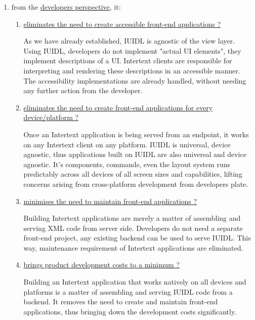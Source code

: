 \begin{enumerate}
\begin{enumerate}
  \end{enumerate}
  \item from the \underline{developers perspective}, it:
  \begin{enumerate}
    \item \underline{ eliminates the need to create accessible front-end applications ?}

    As we have already established, IUIDL is agnostic of the view layer. Using IUIDL, developers do not implement "actual UI elements", they implement descriptions of a UI. Intertext clients are responsible for interpreting and rendering these descriptions in an accessible manner. The accessibility implementations are already handled, without needing any further action from the developer.
    
    \item \underline{eliminates the need to create front-end applications for every} \newline \underline{device/platform ?}

    Once an Intertext application is being served from an endpoint, it works on any Intertext client on any platform. IUIDL is universal, device agnostic, thus applications built on IUIDL are also universal and device agnostic. It's components, commands, even the layout system runs predictably across all devices of all screen sizes and capabilities, lifting concerns arising from cross-platform development from developers plate.
    
    \item \underline{minimises the need to maintain front-end applications ?}

    Building Intertext applications are merely a matter of assembling and serving XML code from server side. Developers do not need a separate front-end project, any existing backend can be used to serve IUIDL. This way, maintenance requirement of Intertext applications are eliminated.
    
    \item \underline{brings product development costs to a minimum ?}

    Building an Intertext application that works natively on all devices and platforms is a matter of assembling and serving IUIDL code from a backend. It removes the need to create and maintain front-end applications, thus bringing down the development costs significantly.
    
  \end{enumerate}
\end{enumerate}

